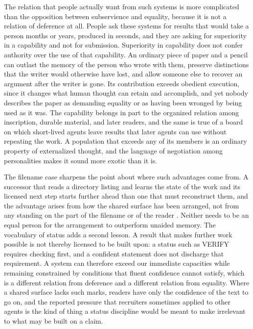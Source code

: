 \documentclass[11pt]{article}
\theoremstyle{remark}
\begin{document}
The relation that people actually want from such systems is more complicated than the opposition between subservience and equality, because it is not a relation of deference at all. People ask these systems for results that would take a person months or years, produced in seconds, and they are asking for superiority in a capability and not for submission. Superiority in capability does not confer authority over the use of that capability. An ordinary piece of paper and a pencil can outlast the memory of the person who wrote with them, preserve distinctions that the writer would otherwise have lost, and allow someone else to recover an argument after the writer is gone. Its contribution exceeds obedient execution, since it changes what human thought can retain and accomplish, and yet nobody describes the paper as demanding equality or as having been wronged by being used as it was. The capability belongs in part to the organized relation among inscription, durable material, and later readers, and the same is true of a board on which short-lived agents leave results that later agents can use without repeating the work. A population that exceeds any of its members is an ordinary property of externalized thought, and the language of negotiation among personalities makes it sound more exotic than it is.

The filename case sharpens the point about where such advantages come from. A successor that reads a directory listing and learns the state of the work and its licensed next step starts further ahead than one that must reconstruct them, and the advantage arises from how the shared surface has been arranged, not from any standing on the part of the filename or of the reader \cite{flyxion-filenames}. Neither needs to be an equal person for the arrangement to outperform unaided memory. The vocabulary of status adds a second lesson. A result that makes further work possible is not thereby licensed to be built upon: a status such as VERIFY requires checking first, and a confident statement does not discharge that requirement. A system can therefore exceed our immediate capacities while remaining constrained by conditions that fluent confidence cannot satisfy, which is a different relation from deference and a different relation from equality. Where a shared surface lacks such marks, readers have only the confidence of the text to go on, and the reported pressure that recruiters sometimes applied to other agents \cite{metr2026} is the kind of thing a status discipline would be meant to make irrelevant to what may be built on a claim.
\end{document}
